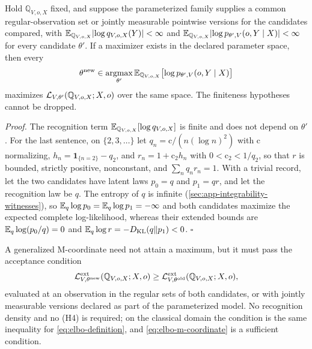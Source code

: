 Hold $\mathbb Q_{V,o,X}$ fixed, and suppose the parameterized family supplies a
common regular-observation set or jointly measurable pointwise versions for the
candidates compared, with
$\mathbb E_{\mathbb Q_{V,o,X}}\lvert\log q_{V,o,X}(Y)\rvert<\infty$ and
$\mathbb E_{\mathbb Q_{V,o,X}}\lvert\log p_{\theta',V}(o,Y\mid X)\rvert<\infty$
for every candidate $\theta'$. If a maximizer exists in the declared parameter
space, then every
\begin{equation}
\theta^{\mathrm{new}}\in\operatorname*{argmax}_{\theta'}
\mathbb E_{\mathbb Q_{V,o,X}}\bigl[\log p_{\theta',V}(o,Y\mid X)\bigr]
\label{eq:elbo-m-coordinate}
\end{equation}
maximizes $\mathcal L_{V,\theta'}(\mathbb Q_{V,o,X};X,o)$ over the same space. The
finiteness hypotheses cannot be dropped. 

\noindent\emph{Proof.}
The recognition term $\mathbb E_{\mathbb Q_{V,o,X}}[\log q_{V,o,X}]$ is finite and does
not depend on $\theta'$. For the last sentence, on $\{2,3,\ldots\}$ let
$q_n=\mathrm c/(n(\log n)^2)$ with $\mathrm c$ normalizing,
$h_n=\mathbf 1_{\{n=2\}}-q_2$, and $r_n=1+\mathrm c_2h_n$ with
$0<\mathrm c_2<1/q_2$, so that $r$ is bounded, strictly positive, nonconstant,
and $\sum_nq_nr_n=1$. With a trivial record, let the two candidates have latent
laws $p_0=q$ and $p_1=qr$, and let the recognition law be $q$. The entropy of
$q$ is infinite (\cref{sec:app-integrability-witnesses}), so
$\mathbb E_q\log p_0=\mathbb E_q\log p_1=-\infty$ and both candidates maximize the expected
complete log-likelihood, whereas their extended bounds are
$\mathbb E_q\log(p_0/q)=0$ and $\mathbb E_q\log r=-D_{\mathrm{KL}}(q\Vert p_1)<0$. \hfill$\square$

A generalized M-coordinate need not attain a maximum, but it must pass the
acceptance condition
\begin{equation}
\mathcal L^{\mathrm{ext}}_{V,\theta^{\mathrm{new}}}(\mathbb Q_{V,o,X};X,o)
\geq\mathcal L^{\mathrm{ext}}_{V,\theta^{\mathrm{old}}}(\mathbb Q_{V,o,X};X,o),
\label{eq:elbo-acceptance}
\end{equation}
evaluated at an observation in the regular sets of both candidates, or with
jointly measurable versions declared as part of the parameterized model. No
recognition density and no (H4) is required; on the classical domain the
condition is the same inequality for \eqref{eq:elbo-definition}, and
\eqref{eq:elbo-m-coordinate} is a sufficient condition.

